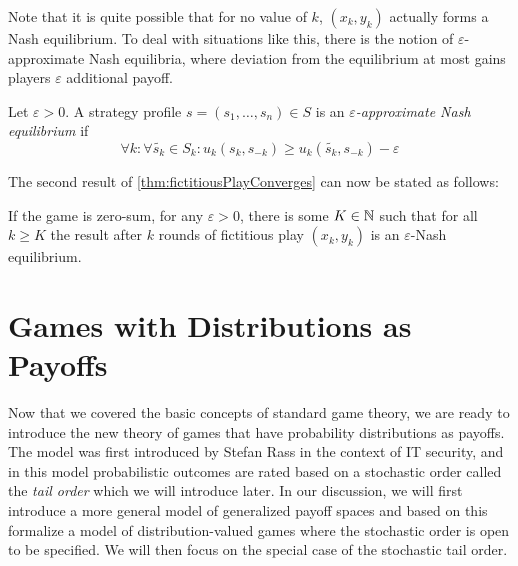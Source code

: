 \documentclass[a4paper]{scrreprt}
\let\epsilon\varepsilon
\begin{document}
    Note that it is quite possible that for no value of $k$, $(x_k, y_k)$ actually forms a Nash equilibrium.
    To deal with situations like this, there is the notion of $\epsilon$-approximate Nash equilibria, where deviation from the equilibrium at most gains players $\epsilon$ additional payoff.
        
    \begin{defn}
        Let $\epsilon > 0$.
        A strategy profile $s = (s_1, \dots, s_n) \in S$ is an \emph{$\epsilon$-approximate Nash equilibrium} if
        \[
            \forall k: \forall \tilde{s_k} \in S_k: u_k(s_k, s_{-k}) \geq u_k(\tilde{s_k}, s_{-k}) - \epsilon
        \]
    \end{defn}

    The second result of \ref{thm:fictitiousPlayConverges} can now be stated as follows:
    \begin{cor}
        If the game is zero-sum, for any $\epsilon > 0$, there is some $K \in \mathbb{N}$ such that for all $k \geq K$ the result after $k$ rounds of fictitious play $(x_k, y_k)$ is an $\epsilon$-Nash equilibrium.
    \end{cor}

    
    
    
    
    
    
    \chapter{Games with Distributions as Payoffs}
    Now that we covered the basic concepts of standard game theory, we are ready to introduce the new theory of games that have probability distributions as payoffs.
    The model was first introduced by Stefan Rass %
    in the context of IT security, and in this model probabilistic outcomes are rated based on a stochastic order called the \emph{tail order} which we will introduce later.
    In our discussion, we will first introduce a more general model of generalized payoff spaces and based on this formalize a model of distribution-valued games where the stochastic order is open to be specified. We will then focus on the special case of the stochastic tail order.
    
\end{document}
